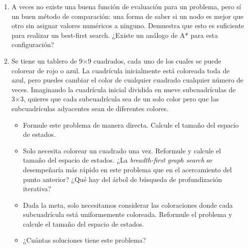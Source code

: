 \begin{enumerate}
\begin{itemize}
    \end{itemize}
    \item A veces no existe una buena función de evaluación para un problema, pero sí un buen método de comparación: una forma de saber si un nodo es mejor que otro sin asignar valores numéricos a ninguno. Demuestra que esto es suficiente para realizar un best-first search. ¿Existe un análogo de A* para esta configuración?
    \item Se tiene un tablero de 9×9 cuadrados, cada uno de los cuales se puede colorear de rojo o azul. La cuadrícula inicialmente está coloreada toda de azul, pero puedes cambiar el color de cualquier cuadrado cualquier número de veces. Imaginando la cuadrícula inicial dividida en nueve subcuadrículas de 3×3, quieres que cada subcuadrícula sea de un solo color pero que las subcuadrículas adyacentes sean de diferentes colores.
    \begin{itemize}
      \item Formule este problema de manera directa. Calcule el tamaño del espacio de estados.
      \item Solo necesita colorear un cuadrado una vez. Reformule y calcule el tamaño del espacio de estados. ¿La \textit{breadth-first graph search} se desempeñaría más rápido en este problema que en el acercamiento del punto anterior? ¿Qué hay del árbol de búsqueda de profundización iterativa?
      \item Dada la meta, solo necesitamos considerar las coloraciones donde cada subcuadrícula está uniformemente coloreada. Reformule el problema y calcule el tamaño del espacio de estados.
      \item ¿Cuántas soluciones tiene este problema?
    \end{itemize}
  \end{enumerate}

